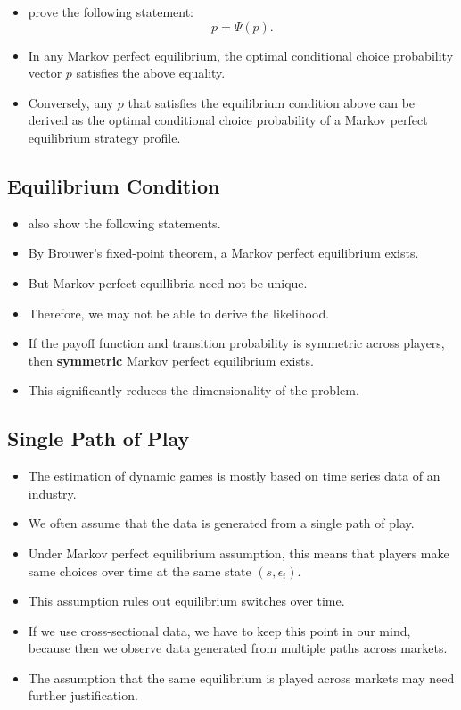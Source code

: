 \documentclass[
]{book}
\providecommand{\tightlist}{%
  \setlength{\itemsep}{0pt}\setlength{\parskip}{0pt}}
\begin{document}
\begin{itemize}
\tightlist
\item
  \citet{pesendorferAsymptoticLeastSquares2008} prove the following statement:
  \begin{equation}
  p = \Psi(p).
  \end{equation}
\item
  In any Markov perfect equilibrium, the optimal conditional choice probability vector \(p\) satisfies the above equality.
\item
  Conversely, any \(p\) that satisfies the equilibrium condition above can be derived as the optimal conditional choice probability of a Markov perfect equilibrium strategy profile.
\end{itemize}

\hypertarget{equilibrium-condition-2}{%
\subsection{Equilibrium Condition}\label{equilibrium-condition-2}}

\begin{itemize}
\tightlist
\item
  \citet{pesendorferAsymptoticLeastSquares2008} also show the following statements.
\item
  By Brouwer's fixed-point theorem, a Markov perfect equilibrium exists.
\item
  But Markov perfect equillibria need not be unique.
\item
  Therefore, we may not be able to derive the likelihood.
\item
  If the payoff function and transition probability is symmetric across players, then \textbf{symmetric} Markov perfect equilibrium exists.
\item
  This significantly reduces the dimensionality of the problem.
\end{itemize}

\hypertarget{single-path-of-play}{%
\subsection{Single Path of Play}\label{single-path-of-play}}

\begin{itemize}
\tightlist
\item
  The estimation of dynamic games is mostly based on time series data of an industry.
\item
  We often assume that the data is generated from a single path of play.
\item
  Under Markov perfect equilibrium assumption, this means that players make same choices over time at the same state \((s, \epsilon_i)\).
\item
  This assumption rules out equilibrium switches over time.
\item
  If we use cross-sectional data, we have to keep this point in our mind, because then we observe data generated from multiple paths across markets.
\item
  The assumption that the same equilibrium is played across markets may need further justification.
\end{itemize}
\end{document}
